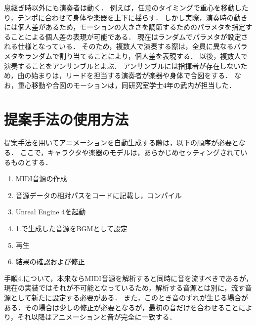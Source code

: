 \indent
息継ぎ時以外にも演奏者は動く．
例えば，任意のタイミングで重心を移動したり，テンポに合わせて身体や楽器を上下に揺らす．
しかし実際，演奏時の動きには個人差があるため，モーションの大きさを調節するためのパラメタを指定することによる個人差の表現が可能である．
現在はランダムでパラメタが設定される仕様となっている．
そのため，複数人で演奏する際は，全員に異なるパラメタをランダムで割り当てることにより，個人差を表現する．
以後，複数人で演奏することをアンサンブルとよぶ．
アンサンブルには指揮者が存在しないため，曲の始まりは，リードを担当する演奏者が楽器や身体で合図をする．
なお，重心移動や合図のモーションは，同研究室学士4年の武内が担当した．

\section{提案手法の使用方法} \label{sec:howto}
提案手法を用いてアニメーションを自動生成する際は，以下の順序が必要となる．
ここで，キャラクタや楽器のモデルは，あらかじめセッティングされているものとする．
\begin{enumerate}
	\item MIDI音源の作成
	\item 音源データの相対パスをコードに記載し，コンパイル
	\item Unreal Engine 4を起動
	\item 1.で生成した音源をBGMとして設定
	\item 再生
	\item 結果の確認および修正
\end{enumerate}\par
手順4.について，本来ならMIDI音源を解析すると同時に音を流すべきであるが，現在の実装ではそれが不可能となっているため，解析する音源とは別に，流す音源として新たに設定する必要がある．
また，このとき音のずれが生じる場合がある．その場合は少しの修正が必要となるが，最初の音だけを合わせることにより，それ以降はアニメーションと音が完全に一致する．
